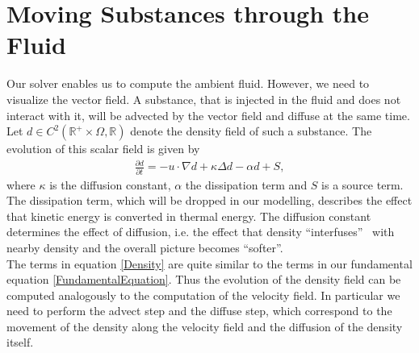 \documentclass[a4paper,10pt,oneside,final,german,openbib,pdftex,titlepage]{scrbook}
\begin{document}
\section{Moving Substances through the Fluid}
Our solver enables us to compute the ambient fluid. However, we need to visualize the vector field. A substance, that is injected in the fluid and does not interact with it, will be advected by the vector field and diffuse at the same time. Let $d \in C^2(\mathbb{R}^+\times\Omega, \mathbb{R})$ denote the density field of such a substance. The evolution of this scalar field is given by
\begin{align}
	\frac{\partial d}{\partial t} = - u \cdot \nabla d + \kappa \Delta d - \alpha  d + S, \label{Density}
\end{align}
where $\kappa$ is the diffusion constant, $\alpha$ the dissipation term and $S$ is a source term. The dissipation term, which will be dropped in our modelling, describes the effect that kinetic energy is converted in thermal energy. The diffusion constant determines the effect of diffusion, i.e. the effect that density ``interfuses'' ~with nearby density and the overall picture becomes ``softer''.\\

The terms in equation \ref{Density} are quite similar to the terms in our fundamental equation \ref{FundamentalEquation}. Thus the evolution of the density field can be computed analogously to the computation of the velocity field. In particular we need to perform the advect step and the diffuse step, which correspond to the movement of the density along the velocity field and the diffusion of the density itself.
\end{document}
